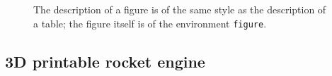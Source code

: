 \documentclass{poster16}
\begin{document}
%
\begin{figure}[ht!]
\begin{center}
%
\caption{The description of a figure is of the same style as the description of a table; the figure itself is of the environment \texttt{figure}.
} 
\label{fig1}
\end{center}
\end{figure}%
%
%
%

\subsection{3D printable rocket engine}
\end{document}
